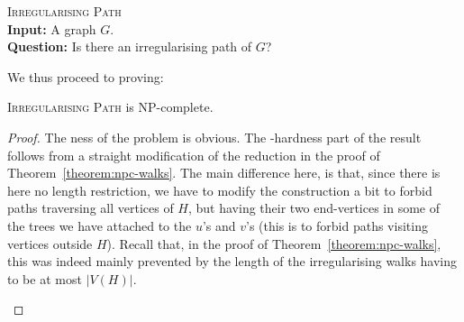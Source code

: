 \documentclass[a4paper,11pt,dvipsnames]{elsarticle}
\begin{document}
\medskip

\noindent\textsc{Irregularising Path}\\
\noindent\textbf{Input:} A graph $G$.\\
\noindent\textbf{Question:} Is there an irregularising path of $G$?

\medskip

We thus proceed to proving:

\begin{theorem}\label{theorem:npc-paths}
\textsc{Irregularising Path} is \textsf{NP}-complete.
\end{theorem}

\begin{proof}
The {\np}ness of the problem is obvious.
The \np-hardness part of the result follows from a straight modification of the reduction in the proof of Theorem~\ref{theorem:npc-walks}. The main difference here, is that, since there is here no length restriction, we have to modify the construction a bit to forbid paths traversing all vertices of $H$, but having their two end-vertices in some of the trees we have attached to the $u$'s and $v$'s (this is to forbid paths visiting vertices outside $H$).
Recall that, in the proof of Theorem~\ref{theorem:npc-walks}, this was indeed mainly prevented by the length of the irregularising walks having to be at most $|V(H)|$.

\begin{figure}[t]
\centering

\end{figure}
\end{proof}
\end{document}
